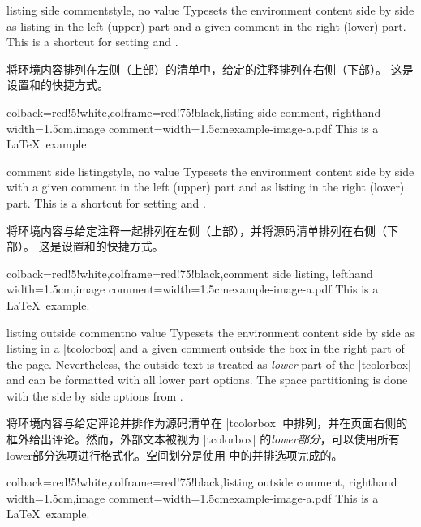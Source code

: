 \begin{docTcbKey}{listing side comment}{}{style, no value}
Typesets the environment content side by side as listing in the left (upper)
part and a given comment in the right (lower) part.
This is a shortcut for setting  and .

将环境内容排列在左侧（上部）的清单中，给定的注释排列在右侧（下部）。 这是设置和的快捷方式。
\begin{dispExample}
\begin{tcblisting}{colback=red!5!white,colframe=red!75!black,listing side comment,
righthand width=1.5cm,image comment={width=1.5cm}{example-image-a.pdf}}
This is a \LaTeX\ example.
\end{tcblisting}
\end{dispExample}
\end{docTcbKey}


\begin{docTcbKey}{comment side listing}{}{style, no value}
Typesets the environment content side by side with a given comment in the left (upper)
part and as listing in the right (lower) part.
This is a shortcut for setting  and .

将环境内容与给定注释一起排列在左侧（上部），并将源码清单排列在右侧（下部）。 这是设置和的快捷方式。
\begin{dispExample}
\begin{tcblisting}{colback=red!5!white,colframe=red!75!black,comment side listing,
lefthand width=1.5cm,image comment={width=1.5cm}{example-image-a.pdf}}
This is a \LaTeX\ example.
\end{tcblisting}
\end{dispExample}
\end{docTcbKey}


\begin{docTcbKey}{listing outside comment}{}{no value}
Typesets the environment content side by side as listing in a |tcolorbox|
and a given comment outside the box in the right part of the page.
Nevertheless, the outside text is treated as \emph{lower} part of the
|tcolorbox| and can be formatted with all lower part options.
The space partitioning is done with the side by side options from
.

将环境内容与给定评论并排作为源码清单在 |tcolorbox| 中排列，并在页面右侧的框外给出评论。然而，外部文本被视为 |tcolorbox| 的\emph{lower部分}，可以使用所有lower部分选项进行格式化。空间划分是使用  中的并排选项完成的。
\begin{dispExample}
\begin{tcblisting}{colback=red!5!white,colframe=red!75!black,listing outside comment,
righthand width=1.5cm,image comment={width=1.5cm}{example-image-a.pdf}}
This is a \LaTeX\ example.
\end{tcblisting}
\end{dispExample}
\end{docTcbKey}


